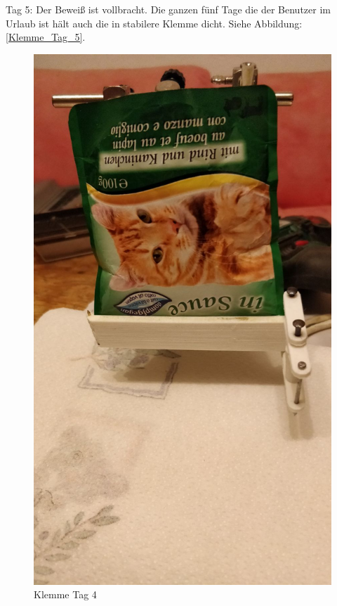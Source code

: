 Tag 5: Der Beweiß ist vollbracht. Die ganzen fünf Tage die der Benutzer im Urlaub ist hält auch die in stabilere Klemme dicht. Siehe Abbildung: \ref{Klemme_Tag_5}.

\begin{figure}[H]
   \begin{minipage}[hbt]{.3\linewidth} %
      \includegraphics[width=\linewidth]{Bilder/Dichtheitsexperiment/Tag_4}
      \caption{Klemme Tag 4}
      \label{Klemme_Tag_4} 

\end{minipage}
\end{figure}
